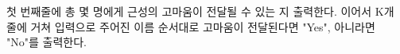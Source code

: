 첫 번째줄에 총 몇 명에게 근성의 고마움이 전달될 수 있는 지 출력한다.
이어서 K개 줄에 거쳐 입력으로 주어진 이름 순서대로 고마움이 전달된다면 "Yes", 아니라면 "No"를 출력한다.
